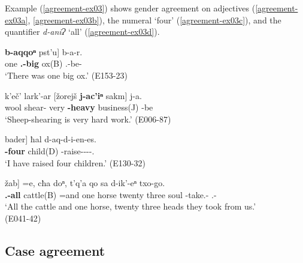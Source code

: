 Example (\ref{agreement-ex03}) shows gender agreement on adjectives (\ref{agreement-ex03a}, \ref{agreement-ex03b}), the numeral `four' (\ref{agreement-ex03c}), and the quantifier \textit{d-aniɁ} `all' (\ref{agreement-ex03d}).\largerpage[2]

\begin{exe}
	\ex\label{agreement-ex03}
	\begin{xlist}
		
		
			\ex\label{agreement-ex03a}
			\gll {{\normalfont[}cħa} \textbf{b-aqqoⁿ} {pst'u{\normalfont]}} b-a-r. \\
			one \textbf{{\B}.{\Sg}-big} ox(B) {\B}.{\Sg}-be-{\Imprf} \\
			\trans `There was one big ox.'
			\hfill (E153-23)
		
		
		
			\ex\label{agreement-ex03b}
			\gll k'eč' lark'-ar {{\normalfont[}žorejš} \textbf{j-ac'iⁿ} {sakm{\normalfont]}} j-a.\\
			wool shear-{\Vn} very \textbf{{\J}-heavy} business(J) {\J}-be \\
			\trans `Sheep-shearing is very hard work.'
			\hfill (E006-87)
		   
		
		
			\ex\label{agreement-ex03c}
			\gll {{\normalfont[}\textbf{d-ʕivɁ}} {bader{\normalfont]}} ħal d-aq-d-i-en-es. \\
			\textbf{{\D}-four} child(D) {\Pv} {\D}-raise-{\D}-{\Tr}-{\Aor}-{\Fsg}.{\Erg} \\
			\trans `I have raised four children.'
			\hfill (E130-32)
		   
		
		
			\ex\label{agreement-ex03d}
			\gll {{\normalfont[}\textbf{b-aniɁ}} {žab{\normalfont]}} =e, cħa doⁿ, t'q'a qo sa d-ik'-eⁿ txo-go. \\
			\textbf{{\B}.{\Sg}-all} cattle(B) =and one horse twenty three soul {\D}-take.{\Anim}-{\Aor} {\Fpl}.{\Excl}-{\Adess} \\
			\trans `All the cattle and one horse, twenty three heads they took from us.' \\
			\hfill (E041-42)
		
		
		
		
	\end{xlist}
\end{exe}

\subsection{Case agreement} \label{caseagree}

